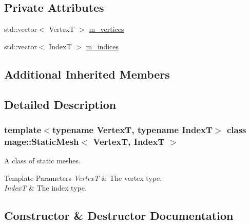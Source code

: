 \subsection*{Private Attributes}
\begin{DoxyCompactItemize}
\item 
std\+::vector$<$ VertexT $>$ \hyperlink{classmage_1_1_static_mesh_a2e4bad427bfd2ff874dcff776cc4dc51}{m\+\_\+vertices}
\item 
std\+::vector$<$ IndexT $>$ \hyperlink{classmage_1_1_static_mesh_abc6b5fb8eaaf9e597ba6efe48f9e779e}{m\+\_\+indices}
\end{DoxyCompactItemize}
\subsection*{Additional Inherited Members}


\subsection{Detailed Description}
\subsubsection*{template$<$typename VertexT, typename IndexT$>$\newline
class mage\+::\+Static\+Mesh$<$ Vertex\+T, Index\+T $>$}

A class of static meshes.


\begin{DoxyTemplParams}{Template Parameters}
{\em VertexT} & The vertex type. \\
\hline
{\em IndexT} & The index type. \\
\hline
\end{DoxyTemplParams}


\subsection{Constructor \& Destructor Documentation}
\hypertarget{classmage_1_1_static_mesh_a12e95f33bd56ad37e931fcf4e1679a12}{}\label{classmage_1_1_static_mesh_a12e95f33bd56ad37e931fcf4e1679a12} 
